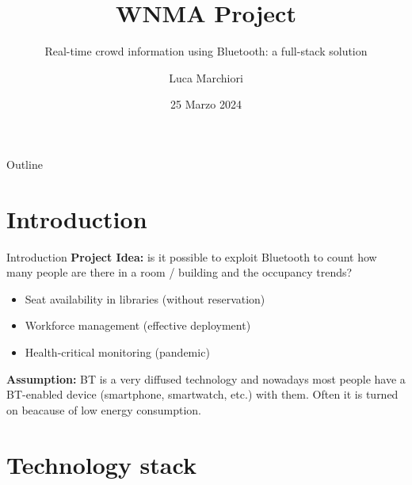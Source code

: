 \documentclass{beamer}
\title{WNMA Project}
\subtitle{Real-time crowd information using Bluetooth: a full-stack solution}
\author{Luca Marchiori}
\date{25 Marzo 2024}
\begin{document}
\maketitle

\begin{frame}{Outline}
	\tableofcontents
\end{frame}


\section{Introduction}

\begin{frame}{Introduction}
	\textbf{Project Idea:} is it possible to exploit Bluetooth to count how many people are there in a room / building and the occupancy trends?
	\begin{itemize}
		\item Seat availability in libraries (without reservation)\vspace{.5em}
		\item Workforce management (effective deployment)\vspace{.5em}
		\item Health-critical monitoring (pandemic)\vspace{.5em}
	\end{itemize}

	\textbf{Assumption:} BT is a very diffused technology and nowadays most people have a BT-enabled device (smartphone, smartwatch, etc.) with them. Often it is turned on beacause of low energy consumption.

\end{frame}

\section{Technology stack}
\end{document}
